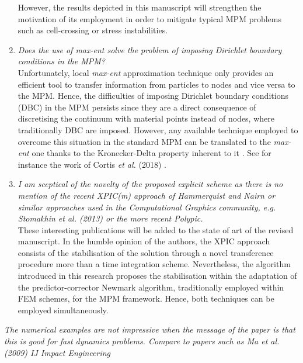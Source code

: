 \documentclass[12pt]{article}
\begin{document}
\begin{enumerate}
However, the results depicted in this manuscript will strengthen the motivation of its employment in order to mitigate typical MPM problems such as cell-crossing or stress instabilities.  

\item \textit{Does the use of max-ent solve the problem of imposing Dirichlet boundary conditions in the MPM?}\\

Unfortunately, local \textit{max-ent} approximation technique only provides an efficient tool to transfer information from particles to nodes and vice versa to the MPM. Hence, the difficulties of imposing Dirichlet boundary conditions (DBC) in the MPM persists since they are a direct consequence of discretising the continuum with material points instead of nodes, where traditionally DBC are imposed. However, any available technique employed to overcome this situation in the standard MPM can be translated to the \textit{max-ent} one thanks to the Kronecker-Delta property inherent to it \cite{Arroyo2006}. See for instance the work of Cortis {\it et al.} (2018) \cite{Cortis_et_al_2017_IJNME}.

\item \textit{I am sceptical of the novelty of the proposed explicit scheme as there is no mention of the recent XPIC(m) approach of Hammerquist and Nairn or similar approaches used in the Computational Graphics community, e.g. Stomakhin et al. (2013) or the more recent Polypic.}\\

These interesting publications will be added to the state of art of the revised manuscript. In the humble opinion of the authors, the XPIC approach consists of the stabilisation of the solution through a novel transference procedure more than a time integration scheme. Nevertheless, the algorithm introduced in this research proposes the stabilisation within the adaptation of the predictor-corrector Newmark algorithm, traditionally employed within FEM schemes, for the MPM framework. Hence, both techniques can be employed simultaneously.

\end{enumerate}

 \textit{The numerical examples are not impressive when the message of the paper is that this is good for fast dynamics problems. Compare to papers such as Ma et al. (2009) IJ Impact Engineering}\\
\end{document}
